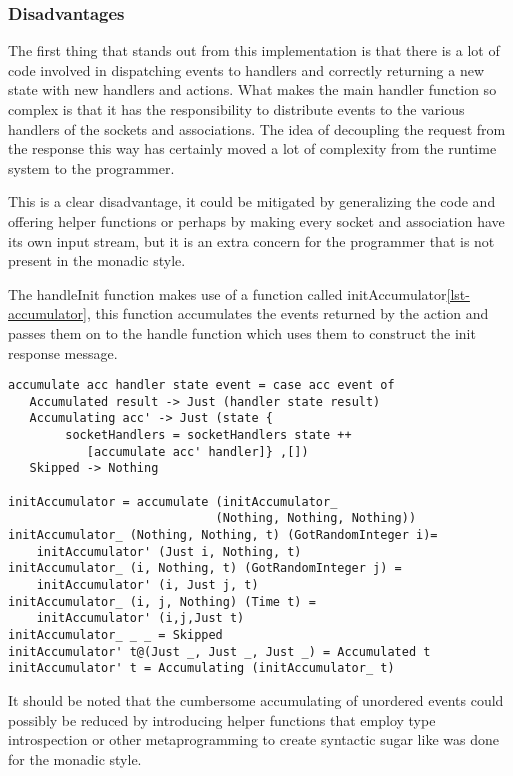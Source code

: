 \subsubsection{Disadvantages}
The first thing that stands out from this implementation is that there is a lot of code involved in dispatching events to handlers and correctly returning a new state with new handlers and actions.
What makes the main handler function so complex is that it has the responsibility to distribute events to the various handlers of the sockets and associations. 
The idea of decoupling the request from the response this way has certainly moved a lot of complexity from the runtime system to the programmer. 

This is a clear disadvantage, it could be mitigated by generalizing the code and offering helper functions or perhaps by making every socket and association have its own input stream, but it is an extra concern for the programmer that is not present in the monadic style.

The handleInit function makes use of a function called initAccumulator\ref{lst-accumulator}, this function accumulates the events returned by the action and passes them on to the handle function which uses them to construct the init response message.

\begin{lstlisting}[caption={The accumulator}, label={lst-accumulator}]
accumulate acc handler state event = case acc event of
   Accumulated result -> Just (handler state result)
   Accumulating acc' -> Just (state {
        socketHandlers = socketHandlers state ++
           [accumulate acc' handler]} ,[])
   Skipped -> Nothing

initAccumulator = accumulate (initAccumulator_ 
                             (Nothing, Nothing, Nothing))
initAccumulator_ (Nothing, Nothing, t) (GotRandomInteger i)=
    initAccumulator' (Just i, Nothing, t)
initAccumulator_ (i, Nothing, t) (GotRandomInteger j) =
    initAccumulator' (i, Just j, t)
initAccumulator_ (i, j, Nothing) (Time t) =
    initAccumulator' (i,j,Just t)
initAccumulator_ _ _ = Skipped
initAccumulator' t@(Just _, Just _, Just _) = Accumulated t
initAccumulator' t = Accumulating (initAccumulator_ t)
\end{lstlisting}

It should be noted that the cumbersome accumulating of unordered events could possibly be reduced by introducing helper functions that employ type introspection or other metaprogramming to create syntactic sugar like was done for the monadic style. 
